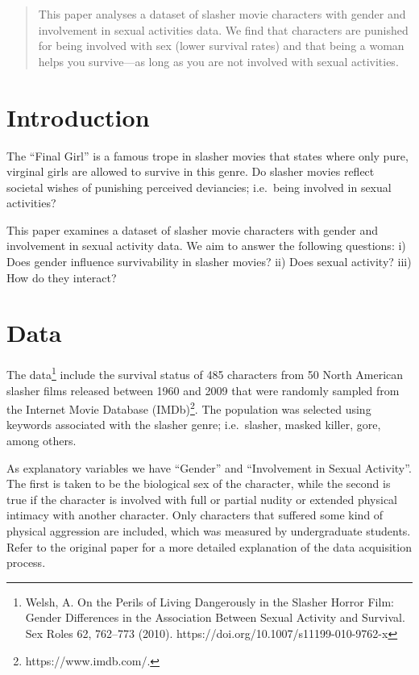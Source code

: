 \documentclass[10pt]{article}
\begin{document}
\maketitle

\begin{abstract}
This paper analyses a dataset of slasher movie characters with gender and involvement in sexual activities data. We find that characters are punished for being involved with sex (lower survival rates) and that being a woman helps you survive---as long as you are not involved with sexual activities.
\end{abstract}

\section{Introduction}
The ``Final Girl'' is a famous trope in slasher movies that states where only pure, virginal girls are allowed to survive in this genre. Do slasher movies reflect societal wishes of punishing perceived deviancies; i.e.\ being involved in sexual activities?

This paper examines a dataset of slasher movie characters with gender and involvement in sexual activity data. We aim to answer the following questions: i) Does gender influence survivability in slasher movies? ii) Does sexual activity? iii) How do they interact?


\section{Data}\label{data}
The data\footnote{Welsh, A. On the Perils of Living Dangerously in the Slasher Horror Film: Gender Differences in the Association Between Sexual Activity and Survival. Sex Roles 62, 762–773 (2010). https://doi.org/10.1007/s11199-010-9762-x} include the survival status of 485 characters from 50 North American slasher films released between 1960 and 2009 that were randomly sampled from the Internet Movie Database (IMDb)\footnote{https://www.imdb.com/.}. The population was selected using keywords associated with the slasher genre; i.e.\ slasher, masked killer, gore, among others.

As explanatory variables we have ``Gender'' and ``Involvement in Sexual Activity''. The first is taken to be the biological sex of the character, while the second is true if the character is involved with full or partial nudity or extended physical intimacy with another character. Only characters that suffered some kind of physical aggression are included, which was measured by undergraduate students. Refer to the original paper for a more detailed explanation of the data acquisition process.
\end{document}
